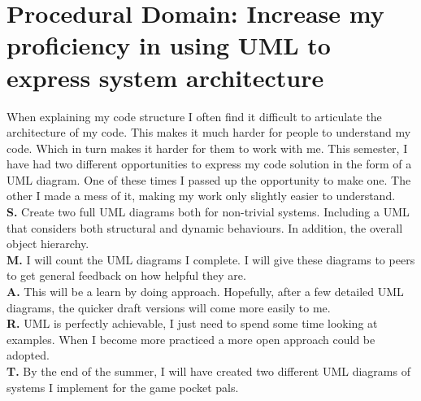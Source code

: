 \documentclass{scrartcl}
\begin{document}
\section{Procedural Domain: Increase my proficiency in using UML to express system architecture}
When explaining my code structure I often find it difficult to articulate the architecture of my code. This makes it much harder for people to understand my code. Which in turn makes it harder for them to work with me. 
This semester, I have had two different opportunities to express my code solution in the form of a UML diagram. One of these times I  passed up the opportunity to make one. The other I made a mess of it, making my work only
slightly easier to understand.\\
\textbf{S.} Create two full UML diagrams both for non-trivial systems. Including a UML that considers both structural and dynamic behaviours. In addition, the overall object hierarchy. \\
\textbf{M.} I will count the UML diagrams I complete. I will give these diagrams to peers to get general feedback on how helpful they are.\\
\textbf{A.} This will be a learn by doing approach. Hopefully, after a few detailed UML diagrams, the quicker draft versions will come more easily to me.\\
\textbf{R.}  UML is perfectly achievable, I just need to spend some time looking at examples. When I become more practiced a more open approach could be adopted.\\
\textbf{T.}  By the end of the summer, I will have created two different UML diagrams of systems I implement for the game pocket pals.\\




\end{document}
